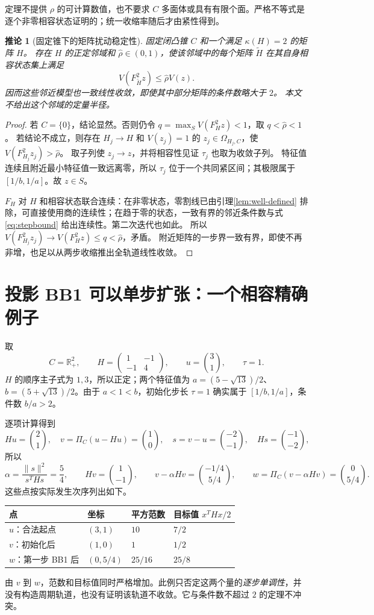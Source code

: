 \documentclass[11pt,a4paper,UTF8,fontset=fandol]{ctexart}
\newtheorem{corollary}[theorem]{推论}
\theoremstyle{remark}\newtheorem{remark}[theorem]{说明}
\newcommand{\R}{\mathbb R}
\newcommand{\norm}[1]{\lVert #1\rVert}
\begin{document}
定理不提供 $\rho$ 的可计算数值，也不要求 $C$ 多面体或具有有限个面。严格不等式是逐个非零相容状态证明的；统一收缩率随后才由紧性得到。

\begin{corollary}[固定锥下的矩阵扰动稳定性]\label{cor:perturbation}
固定闭凸锥 $C$ 和一个满足 $\kappa(H)=2$ 的矩阵 $H$。
存在 $H$ 的正定邻域和 $\widehat\rho\in(0,1)$，使该邻域中的每个矩阵
$\widetilde H$ 在其自身相容状态集上满足
\[
 V(F_{\widetilde H}^{2}z)\le\widehat\rho V(z).
\]
因而这些邻近模型也一致线性收敛，即使其中部分矩阵的条件数略大于 $2$。
本文不给出这个邻域的定量半径。
\end{corollary}
\begin{proof}
若 $C=\{0\}$，结论显然。否则仍令 $q=\max_{S}V(F_H^2z)<1$，取 $q<\widehat\rho<1$。
若结论不成立，则存在 $H_j\to H$ 和 $V(z_j)=1$ 的
$z_j\in\Omega_{H_j,C}$，使 $V(F_{H_j}^2z_j)>\widehat\rho$。
取子列使 $z_j\to z$，并将相容性见证 $\tau_j$ 也取为收敛子列。
特征值连续且附近最小特征值一致远离零，所以 $\tau_j$ 位于一个共同紧区间；其极限属于 $[1/b,1/a]$。故 $z\in S$。

$F_H$ 对 $H$ 和相容状态联合连续：在非零状态，零割线已由引理\ref{lem:well-defined} 排除，可直接使用商的连续性；在趋于零的状态，一致有界的邻近条件数与式\eqref{eq:stepbound} 给出连续性。第二次迭代也如此。
所以 $V(F_{H_j}^2z_j)\to V(F_H^2z)\le q<\widehat\rho$，矛盾。
附近矩阵的一步界一致有界，即使不再非增，也足以从两步收缩推出全轨道线性收敛。
\end{proof}

\section{投影 BB1 可以单步扩张：一个相容精确例子}
取
\[
 C=\R_+^2,\qquad H=\begin{pmatrix}1&-1\\-1&4\end{pmatrix},
 \qquad u=\binom31,\qquad\tau=1.
\]
$H$ 的顺序主子式为 $1,3$，所以正定；两个特征值为
$a=(5-\sqrt{13})/2$、$b=(5+\sqrt{13})/2$。由于 $a<1<b$，初始化步长
$\tau=1$ 确实属于 $[1/b,1/a]$，条件数 $b/a>2$。

逐项计算得到
\[
 Hu=\binom21,\quad v=\Pi_C(u-Hu)=\binom10,\quad
 s=v-u=\binom{-2}{-1},\quad Hs=\binom{-1}{-2},
\]
所以
\[
 \alpha=\frac{\norm s^2}{s^THs}=\frac54,\qquad
 Hv=\binom1{-1},\qquad
 v-\alpha Hv=\binom{-1/4}{5/4},\qquad
 w=\Pi_C(v-\alpha Hv)=\binom0{5/4}.
\]
这些点按实际发生次序列出如下。
\begin{center}
\begin{tabular}{llll}
\toprule
点 & 坐标 & 平方范数 & 目标值 $x^THx/2$\\
\midrule
$u$：合法起点 & $(3,1)$ & $10$ & $7/2$\\
$v$：初始化后 & $(1,0)$ & $1$ & $1/2$\\
$w$：第一步 BB1 后 & $(0,5/4)$ & $25/16$ & $25/8$\\
\bottomrule
\end{tabular}
\end{center}
由 $v$ 到 $w$，范数和目标值同时严格增加。此例只否定这两个量的\emph{逐步单调性}，并没有构造周期轨道，也没有证明该轨道不收敛。它与条件数不超过 $2$ 的定理不冲突。
\end{document}
